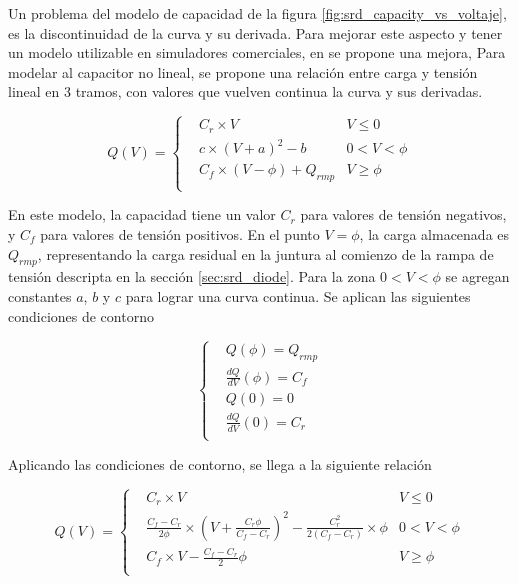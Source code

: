 Un problema del modelo de capacidad de la figura
\ref{fig:srd_capacity_vs_voltaje}, es la discontinuidad de la curva y su
derivada. Para mejorar este aspecto y tener un modelo utilizable en simuladores
comerciales, en \cite{zhang1995} se propone una mejora, Para modelar al
capacitor no lineal, se propone una relación entre carga y tensión lineal en 3
tramos, con valores que vuelven continua la curva y sus derivadas.

\begin{equation}
Q(V) =
    \left\{
    \begin{aligned}
        & C_r \times V  & V \leq 0 \\
        & c \times \left(V+a \right)^2 -b  & 0 < V < \phi \\
        & C_f \times \left( V - \phi \right) + Q_{rmp} & V \geq \phi \\
    \end{aligned}
    \right.
\end{equation}

En este modelo, la capacidad tiene un valor $C_r$ para valores de tensión
negativos, y $C_f$ para valores de tensión positivos. En el punto $V=\phi$, la
carga almacenada es $Q_{rmp}$, representando la carga residual en la juntura al
comienzo de la rampa de tensión descripta en la sección \ref{sec:srd_diode}.
Para la zona $0 < V < \phi$ se agregan constantes $a$, $b$ y $c$ para lograr una
curva continua. Se aplican las siguientes condiciones de contorno

\begin{equation}
    \left\{
    \begin{aligned}
        & Q(\phi) = Q_{rmp} \\
        & \frac{dQ}{dV}(\phi) = C_f \\
        & Q(0) = 0 \\
        & \frac{dQ}{dV}(0) = C_r \\
    \end{aligned}
    \right.
\end{equation}

Aplicando las condiciones de contorno, se llega a la siguiente relación

\begin{equation}
\label{eq:srd_non_linear_cap}
Q(V) =
    \left\{
    \begin{aligned}
        & C_r \times V  & V \leq 0 \\
        & \frac{C_f-C_r}{2\phi} \times \left(V+\frac{C_r\phi}{C_f-C_r} \right)^2
        -\frac{C_r^2}{2\left(C_f-C_r \right)}\times \phi  & 0 < V < \phi \\
        & C_f \times V - \frac{C_f-C_r}{2} \phi & V \geq \phi \\
    \end{aligned}
    \right.
\end{equation}


